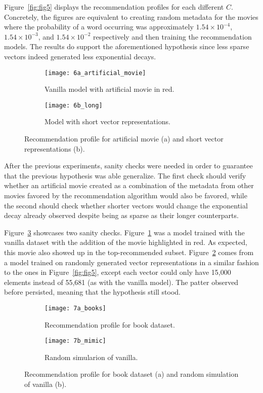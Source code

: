 Figure~\ref{fig:fig5} displays the recommendation profiles for each different
$C$. Concretely, the figures are equivalent to creating random metadata for the
movies where the probability of a word occurring was approximately
$1.54 \times 10^{-4}$, $1.54 \times 10^{-3}$, and $1.54 \times 10^{-2}$ respectively and then
training the recommendation models. The results do support the aforementioned
hypothesis since less sparse vectors indeed generated less exponential decays.

\begin{figure}
  \centering
  \begin{subfigure}{0.45\textwidth}
    \centering
    \texttt{[image: 6a\_artificial\_movie]}
    \caption{Vanilla model with artificial movie in red.\label{fig:fig6a}}
  \end{subfigure}
  \begin{subfigure}{0.45\textwidth}
    \centering
    \texttt{[image: 6b\_long]}
    \caption{Model with short vector representations.\label{fig:fig6b}}
  \end{subfigure}
  \caption{Recommendation profile for artificial movie (a) and short vector
    representations (b).\label{fig:fig6}}
\end{figure}

After the previous experiments, sanity checks were needed in order to guarantee
that the previous hypothesis was able generalize. The first check should verify
whether an artificial movie created as a combination of the metadata from other
movies favored by the recommendation algorithm would also be favored, while the
second should check whether shorter vectors would change the exponential decay
already observed despite being as sparse as their longer counterparts.

Figure~\ref{fig:fig6} showcases two sanity checks. Figure~\ref{fig:fig6a} was a
model trained with the vanilla dataset with the addition of the movie
highlighted in red. As expected, this movie also showed up in the
top-recommended subset. Figure~\ref{fig:fig6b} comes from a model trained on
randomly generated vector representations in a similar fashion to the ones in
Figure~\ref{fig:fig5}, except each vector could only have 15,000 elements
instead of 55,681 (as with the vanilla model). The patter observed before
persisted, meaning that the hypothesis still stood.

\begin{figure}
  \centering
  \begin{subfigure}{0.45\textwidth}
    \centering
    \texttt{[image: 7a\_books]}
    \caption{Recommendation profile for book dataset.\label{fig:fig7a}}
  \end{subfigure}
  \begin{subfigure}{0.45\textwidth}
    \centering
    \texttt{[image: 7b\_mimic]}
    \caption{Random simularion of vanilla.\label{fig:fig7b}}
  \end{subfigure}
  \caption{Recommendation profile for book dataset (a) and random simulation of
    vanilla (b).\label{fig:fig7}}
\end{figure}

